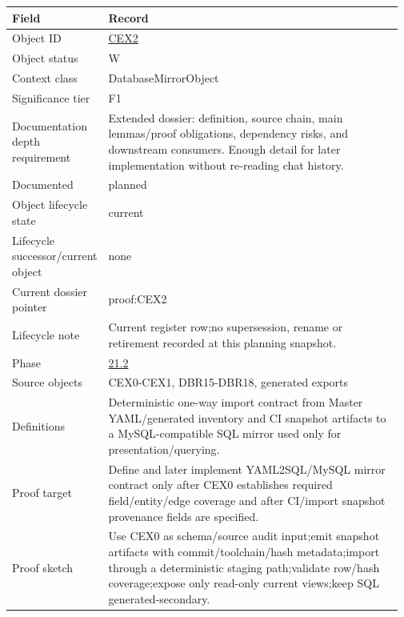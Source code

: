 \begin{longtable}{L{0.16\linewidth} L{0.81\linewidth}}
\hline
\textbf{Field} & \textbf{Record}\\
\hline
Object ID & \hyperlink{object-row-CEX2}{CEX2}\\
\hline\addlinespace[0.20em]
Object status & W\\
\hline\addlinespace[0.20em]
Context class & DatabaseMirrorObject\\
\hline\addlinespace[0.20em]
Significance tier & F1\\
\hline\addlinespace[0.20em]
Documentation depth requirement & Extended dossier: definition, source chain, main lemmas/\allowbreak{}proof obligations, dependency risks, and downstream consumers. Enough detail for later implementation without re-reading chat history.\\
\hline\addlinespace[0.20em]
Documented & planned\\
\hline\addlinespace[0.20em]
Object lifecycle state & current\\
\hline\addlinespace[0.20em]
Lifecycle successor/\allowbreak{}current object & none\\
\hline\addlinespace[0.20em]
Current dossier pointer & proof:CEX2\\
\hline\addlinespace[0.20em]
Lifecycle note & Current register row;\newline no supersession, rename or retirement recorded at this planning snapshot.\\
\hline\addlinespace[0.20em]
Phase & \hyperlink{phase-row-21-2}{21.2}\\
\hline\addlinespace[0.20em]
Source objects & CEX0-CEX1, DBR15-DBR18, generated exports\\
\hline\addlinespace[0.20em]
Definitions & Deterministic one-way import contract from Master YAML/\allowbreak{}generated inventory and CI snapshot artifacts to a MySQL-compatible SQL mirror used only for presentation/\allowbreak{}querying.\\
\hline\addlinespace[0.20em]
Proof target & Define and later implement YAML2SQL/\allowbreak{}MySQL mirror contract only after CEX0 establishes required field/\allowbreak{}entity/\allowbreak{}edge coverage and after CI/\allowbreak{}import snapshot provenance fields are specified.\\
\hline\addlinespace[0.20em]
Proof sketch & Use CEX0 as schema/\allowbreak{}source audit input;\newline emit snapshot artifacts with commit/\allowbreak{}toolchain/\allowbreak{}hash metadata;\newline import through a deterministic staging path;\newline validate row/\allowbreak{}hash coverage;\newline expose only read-only current views;\newline keep SQL generated-secondary.\\

\end{longtable}
